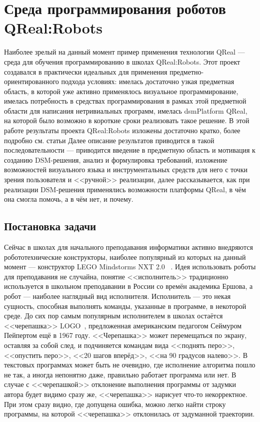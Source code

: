 \section{Среда программирования роботов QReal:Robots}
\label{chapter:qRealRobots}
Наиболее зрелый на данный момент пример применения технологии QReal --- среда для 
обучения программированию в школах QReal:Robots. Этот проект создавался в практически 
идеальных для применения предметно-ориентированного подхода условиях: имелась достаточно 
узкая предметная область, в которой уже активно применялось визуальное программирование, 
имелась потребность в средствах программирования в рамках этой предметной области для 
написания нетривиальных программ, имелась \ac{dsmPlatform} QReal, на которой было возможно 
в короткие сроки реализовать такое решение. В этой работе результаты проекта QReal:Robots изложены достаточно кратко, более подробно см. статьи
\cite{bryksin2011robots, tikhonova2012robots, litvinov2012robots, terekhov2013robots}
Далее описание результатов приводится в такой последовательности --- приводится введение 
в предметную область и мотивация к созданию \ac{DSM}-решения, анализ и формулировка требований, 
изложение возможностей визуального языка и инструментальных средств для него с точки 
зрения пользователя и <<ручной>> реализации, далее рассказывается, как при реализации 
\ac{DSM}-решения применялись возможности платформы QReal, в чём она смогла помочь, а в чём нет, и почему.

\subsection{Постановка задачи}
Сейчас в школах для начального преподавания информатики активно внедряются робототехнические 
конструкторы, наиболее популярный из которых на данный момент --- конструктор LEGO Mindstorms NXT 2.0%
~\cite{mindstorms}. Идея использовать роботы для преподавания не случайна, понятие <<исполнитель>> традиционно 
используется в школьном преподавании в России со времён академика Ершова, а робот --- наиболее 
наглядный вид исполнителя. Исполнитель --- это некая сущность, способная выполнять 
команды, указанные в программе, в некоторой среде. До сих пор самым популярным исполнителем 
в школах остаётся <<черепашка>> LOGO~\cite{logo}, предложенная американским педагогом Сеймуром Пейпертом ещё в 1967 году. <<Черепашка>> 
может перемещаться по экрану, оставляя за собой след, и подчиняется командам вида <<поднять перо>>, 
<<опустить перо>>, <<20 шагов вперёд>>, <<на 90 градусов налево>>. В текстовых программах 
может быть не очевидно, где исполнение алгоритма пошло не так, а иногда непонятно 
даже, правильно работает программа или нет. В случае с <<черепашкой>> отклонение выполнения 
программы от задумки автора будет видимо сразу же, <<черепашка>> нарисует что-то некорректное. 
При этом сразу видно, где допущена ошибка, можно легко найти строку программы, на 
которой <<черепашка>> отклонилась от задуманной траектории.

